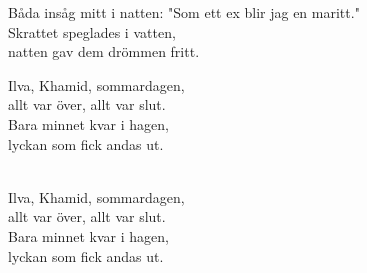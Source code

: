 \begin{lyrics}
Båda insåg mitt i natten:
"Som ett ex blir jag en maritt."\\
Skrattet speglades i vatten,\\
natten gav dem drömmen fritt.

Ilva, Khamid, sommardagen,\\
allt var över, allt var slut.\\
Bara minnet kvar i hagen,\\
lyckan som fick andas ut.

\\
Ilva, Khamid, sommardagen,\\
allt var över, allt var slut.\\
Bara minnet kvar i hagen,\\
lyckan som fick andas ut.
\end{lyrics}

